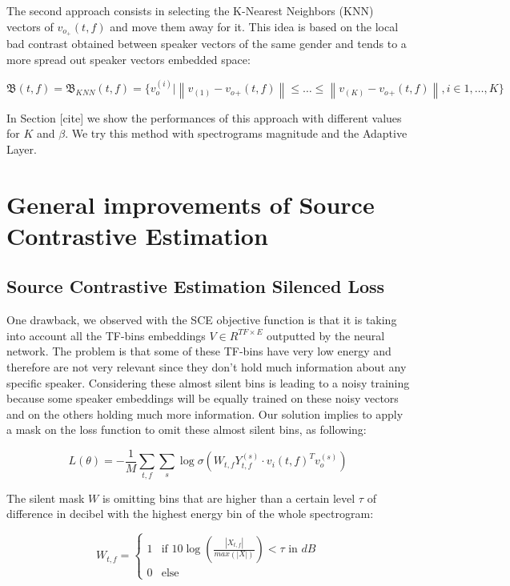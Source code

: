 \documentclass[master, tikz, final,11pt, dvipdfmx]{iscs-thesis}
\newcommand{\norm}[1]{\left\lVert#1\right\rVert}
\begin{document}
The second approach consists in selecting the K-Nearest Neighbors (KNN) vectors of $v_{o_{+}}(t,f)$ and move them away for it. This idea is based on the local bad contrast obtained between speaker vectors of the same gender and tends to a more spread out speaker vectors embedded space:


\[\mathfrak{B}(t,f) = \mathfrak{B}_{KNN}(t,f) = \{v_o^{(i)} | \norm{v_{{(1)}}-v_o{_{+}}(t,f)} \leq \dots \leq \norm{v_{{(K)}}-v_o{_{+}}(t,f)}, i \in 1, \dotsc,K\}\]

In Section [cite] we show the performances of this approach with different values for $K$ and $\beta$. We try this method with spectrograms magnitude and the Adaptive Layer.


\section{General improvements of Source Contrastive Estimation}

\subsection{Source Contrastive Estimation Silenced Loss}
\label{contrib:silence}

One drawback, we observed with the SCE objective function is that it is taking into account all the TF-bins embeddings $V \in R^{TF\times E}$ outputted by the neural network. The problem is that some of these TF-bins have very low energy and therefore are not very relevant since they don't hold much information about any specific speaker. Considering these almost silent bins is leading to a noisy training because some speaker embeddings will be equally trained on these noisy vectors and on the others holding much more information. Our solution implies to apply a mask on the loss function to omit these almost silent bins, as following:

\[L(\theta) = - \frac{1}{M} \sum_{t,f} \sum_{s} \log \sigma(W_{t,f}Y_{t,f}^{(s)}  \cdot v_i(t,f)^{T} v_o^{(s)})\]

The silent mask $W$ is omitting bins that are higher than a certain level $\tau$ of difference in decibel with the highest energy bin of the whole spectrogram:

$$
W_{t,f} =  \left\{
    \begin{array}{ll}
        1 & \mbox{if } 10\log (\frac{|X_{t,f}|}{max(|X|)}) < \tau \mbox{ in } dB  \\
        0 & \mbox{else}
    \end{array}
\right.
$$
\end{document}
